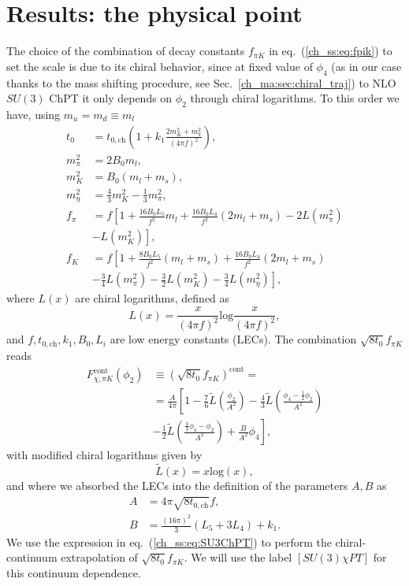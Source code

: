 \section{Results: the physical point}
\label{ch_ss:sec:Results}

The choice of the combination of decay constants $f_{\pi K}$ in eq.~(\ref{ch_ss:eq:fpik}) to set the scale is due to its chiral behavior, since at fixed value of $\phi_4$ (as in our case thanks to the mass shifting procedure, see Sec.~\ref{ch_ma:sec:chiral_traj}) to NLO $SU(3)$ ChPT it only depends on $\phi_2$ through chiral logarithms. To this order we have, using $m_u=m_d\equiv m_l$~\citep{FLAG16,Bar:2013ora}
\begin{align}
t_0&=t_{0,\textrm{ch}}\left(1+k_1\frac{2m_K^2+m_{\pi}^2}{(4\pi f)^2}\right), \\
m_{\pi}^2&=2B_0m_l, \\
m_K^2&=B_0(m_l+m_s), \\
m_{\eta}^2&=\frac{4}{3}m_K^2-\frac{1}{3}m_{\pi}^2, \\
f_{\pi}&=f\left[1+\frac{16B_0L_5}{f^2}m_l+\frac{16B_0L_4}{f^2}(2m_l+m_s)-2L(m_{\pi}^2)\right. \\
&\left.-L(m_K^2)\right], \\
f_K&=f\left[1+\frac{8B_0L_5}{f^2}(m_l+m_s)+\frac{16B_0L_4}{f^2}(2m_l+m_s)\right. \\
&\left.-\frac{3}{4}L(m_{\pi}^2)-\frac{3}{2}L(m_K^2)-\frac{3}{4}L(m_{\eta}^2)\right],
\end{align}
where $L(x)$ are chiral logarithms, defined as
\begin{equation}
L(x)=\frac{x}{(4\pi f)^2}\textrm{log}\frac{x}{(4\pi f)^2},
\end{equation}
and $f,t_{0,\textrm{ch}},k_1,B_0,L_i$ are low energy constants (LECs). The combination $\sqrt{8t_0}f_{\pi K}$ reads
\begin{align}
\label{ch_ss:eq:SU3ChPT}
F_{\chi,\pi K}^{\textrm{cont}}(\phi_2)&\equiv\left(\sqrt{8t_0}f_{\pi K}\right)^{\textrm{cont}}=\\
&=\frac{A}{4\pi}\left[1-\frac{7}{6}\tilde{L}\left(\frac{\phi_2}{A^2}\right)-\frac{4}{3}\tilde{L}\left(\frac{\phi_4-\frac{1}{2}\phi_2}{A^2}\right)\right. \\
&\left.-\frac{1}{2}\tilde{L}\left(\frac{\frac{4}{3}\phi_4-\phi_2}{A^2}\right)+\frac{B}{A^2}\phi_4\right],
\end{align}
with modified chiral logarithms given by
\begin{equation}
\label{ch_ss:eq:log}
\tilde{L}(x)=x{\textrm{log}}\left(x\right),
\end{equation}
and where we absorbed the LECs into the definition of the parameters $A,B$ as
\begin{align}
A&=4\pi\sqrt{8t_{0,\textrm{ch}}}f, \\
B&=\frac{(16\pi)^2}{3}(L_5+3L_4)+k_1.
\end{align} 
We use the expression in eq.~(\ref{ch_ss:eq:SU3ChPT}) to perform the chiral-continuum extrapolation of $\sqrt{8t_0}f_{\pi K}$. We will use the label $[SU(3)\chi PT]$ for this continuum dependence. 


